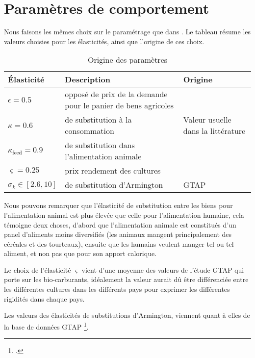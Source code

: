 

\section{Paramètres de comportement}
Nous faisons les mêmes choix sur le paramétrage que dans \cite{Gouel2025}. Le tableau \label{tab:ela} résume les valeurs choisies pour les élasticités, ainsi que l'origine de ces choix.

\begin{table}[h]
    \centering
    \begin{tabularx}{\textwidth}{l >{\raggedright\arraybackslash}X >{\raggedright\arraybackslash}X}
        \textbf{Élasticité}        & \textbf{Description}                                          & \textbf{Origine}                                   \\ \hline
        $\epsilon = 0.5$           & opposé de prix de la demande pour le panier de bens agricoles & \cite{Comin2021}                                   \\
        $\kappa = 0.6$             & de substitution à la consommation                             & Valeur usuelle dans la littérature \cite{Rude2000} \\
        $\kappa_\text{feed} = 0.9$ & de substitution dans l'alimentation animale                   & \cite{Rude2000}                                    \\
        $\varsigma = 0.25$         & prix rendement des cultures                                   & \cite{Keeney2009}                                  \\
        $\sigma_k \in [2.6, 10]$   & de substitution d'Armington                                   & GTAP  \cite{Aguiar2022}                            \\
        \hline
    \end{tabularx}
    \caption{Origine des paramètres}
    \label{tab:ela}
\end{table}

Nous pouvons remarquer que l'élasticité de substitution entre les biens pour l'alimentation animal est plus élevée que celle pour l'alimentation humaine, cela témoigne deux choses, d'abord que l'alimentation animale est constitués d'un panel d'aliments moins diversifiés (les animaux mangent principalement des céréales et des tourteaux), ensuite que les humains veulent manger tel ou tel aliment, et non pas que pour son apport calorique.

Le choix de l'élasticité $\varsigma$ vient d'une moyenne des valeurs de l'étude GTAP \cite{Miller2009} qui porte sur les bio-carburants, idéalement la valeur aurait dû être différenciée entre les différentes cultures dans les différents pays pour exprimer les différentes rigidités dans chaque pays.

Les valeurs des élasticités de substitutions d'Armington, viennent quant à elles de la base de données GTAP \footcite{Aguiar2022}.
